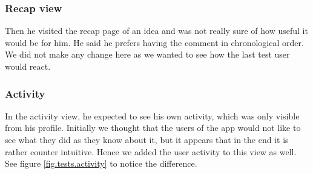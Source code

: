\documentclass[a4paper,12pt, oneside]{article}
\begin{document}
\subsubsection*{Recap view}
Then he visited the recap page of an idea and was not really sure of how useful it would be for him.
He said he prefers having the comment in chronological order.
We did not make any change here as we wanted to see how the last test user would react.


\subsubsection*{Activity}
In the activity view, he expected to see his own activity, which was only visible from his profile.
Initially we thought that the users of the app would not like to see what they did as they know about it, but it appears that in the end it is rather counter intuitive.
Hence we added the user activity to this view as well.
See figure \ref{fig.tests.activity} to notice the difference.
\end{document}
